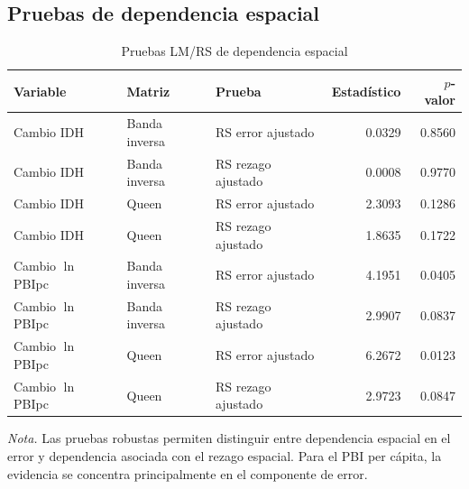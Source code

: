 \subsection{Pruebas de dependencia espacial}

\begin{table}[H]
\centering
\caption{Pruebas LM/RS de dependencia espacial}
\label{tab:anexo_lm}
\scriptsize
\begin{tabular}{lllrr}
\toprule
\textbf{Variable} &
\textbf{Matriz} &
\textbf{Prueba} &
\textbf{Estadístico} &
\textbf{$p$-valor} \\
\midrule
Cambio IDH & Banda inversa & RS error ajustado & 0.0329 & 0.8560 \\
Cambio IDH & Banda inversa & RS rezago ajustado & 0.0008 & 0.9770 \\
Cambio IDH & Queen & RS error ajustado & 2.3093 & 0.1286 \\
Cambio IDH & Queen & RS rezago ajustado & 1.8635 & 0.1722 \\
\midrule
Cambio $\ln$ PBIpc & Banda inversa & RS error ajustado & 4.1951 & 0.0405 \\
Cambio $\ln$ PBIpc & Banda inversa & RS rezago ajustado & 2.9907 & 0.0837 \\
Cambio $\ln$ PBIpc & Queen & RS error ajustado & 6.2672 & 0.0123 \\
Cambio $\ln$ PBIpc & Queen & RS rezago ajustado & 2.9723 & 0.0847 \\
\bottomrule
\end{tabular}
\begin{flushleft}
\footnotesize
\textit{Nota.} Las pruebas robustas permiten distinguir entre dependencia
espacial en el error y dependencia asociada con el rezago espacial. Para el
PBI per cápita, la evidencia se concentra principalmente en el componente de
error.
\end{flushleft}
\end{table}
